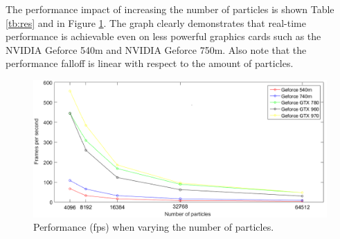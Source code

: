 The performance impact of increasing the number of particles is shown Table \ref{tb:res} and in Figure \ref{fig:graphen}. The graph clearly demonstrates that real-time performance
is achievable even on less powerful graphics cards such as the NVIDIA Geforce
540m and NVIDIA Geforce 750m. Also note that the performance falloff is linear with
respect to the amount of particles.

\begin{figure}[H]
  \centering
  \includegraphics[width=1\textwidth]{img/graph.png}
  \caption{Performance (fps) when varying the number of particles.}
  \label{fig:graphen}
\end{figure}


\begin{center}
      \small
  \label{tb:res}
\end{center}

